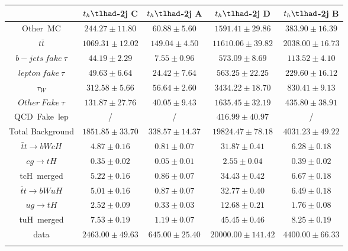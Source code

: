 \begin{tabular}{ccccc} \toprule\toprule
 & $t_{h}\tlhad$-2j C & $t_{h}\tlhad$-2j A & $t_{h}\tlhad$-2j D & $t_{h}\tlhad$-2j B\\\midrule
Other~MC & $244.27\pm11.80$ & $60.88\pm5.60$ & $1591.41\pm29.86$ & $383.90\pm16.39$\\
$t\bar{t}$ & $1069.31\pm12.02$ & $149.04\pm4.50$ & $11610.06\pm39.82$ & $2038.00\pm16.73$\\
$b-jets~fake~\tau$ & $44.19\pm2.29$ & $7.55\pm0.96$ & $573.09\pm8.69$ & $113.52\pm4.10$\\
$lepton~fake~\tau$ & $49.63\pm6.64$ & $24.42\pm7.64$ & $563.25\pm22.25$ & $229.60\pm16.12$\\
$\tau_{W}$ & $312.58\pm5.66$ & $56.64\pm2.60$ & $3434.22\pm18.70$ & $830.41\pm9.13$\\
$Other~Fake~\tau$ & $131.87\pm27.76$ & $40.05\pm9.43$ & $1635.45\pm32.19$ & $435.80\pm38.91$\\
QCD~Fake~lep &  / &  / & $416.99\pm40.97$ &  /\\\midrule
Total Background & $1851.85\pm33.70$ & $338.57\pm14.37$ & $19824.47\pm78.18$ & $4031.23\pm49.22$\\\midrule\midrule
$\bar{t}t\to bWcH$ & $4.87\pm0.16$ & $0.81\pm0.07$ & $31.87\pm0.41$ & $6.28\pm0.18$\\
$cg\to tH$ & $0.35\pm0.02$ & $0.05\pm0.01$ & $2.55\pm0.04$ & $0.39\pm0.02$\\
tcH~merged & $5.22\pm0.16$ & $0.86\pm0.07$ & $34.43\pm0.42$ & $6.67\pm0.18$\\\midrule
$\bar{t}t\to bWuH$ & $5.01\pm0.16$ & $0.87\pm0.07$ & $32.77\pm0.40$ & $6.49\pm0.18$\\
$ug\to tH$ & $2.52\pm0.09$ & $0.33\pm0.03$ & $12.68\pm0.21$ & $1.76\pm0.08$\\
tuH~merged & $7.53\pm0.19$ & $1.19\pm0.07$ & $45.45\pm0.46$ & $8.25\pm0.19$\\\midrule\midrule
data & $2463.00\pm49.63$ & $645.00\pm25.40$ & $20000.00\pm141.42$ & $4400.00\pm66.33$\\
\bottomrule\bottomrule\\
\end{tabular}
